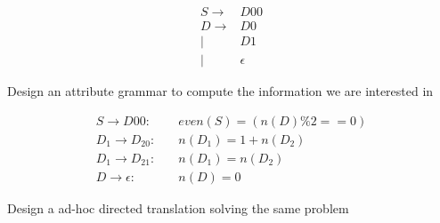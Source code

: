 \documentclass[11pt]{article}
\begin{document}

\maketitle %

\thispagestyle{empty} %

\newpage


\begin{question}



\begin{align*}
S \rightarrow& D00\\
D \rightarrow& D0\\
  |& D1\\
  |& \epsilon
\end{align*}              

\begin{subquestion}{Design an attribute grammar to compute the information we are
interested in}

\begin{align*}
S\rightarrow D00:&\quad even(S) = (n(D)\%2 == 0)\\
D_1\rightarrow D_20:&\quad n(D_1) = 1 + n(D_2)\\
D_1\rightarrow D_21:&\quad n(D_1) = n(D_2)\\
D\rightarrow \epsilon:&\quad n(D) = 0
\end{align*}  

\end{subquestion}

\begin{subquestion}{Design a ad-hoc directed translation solving the same problem} 


\end{subquestion}
\end{question}
\end{document}

